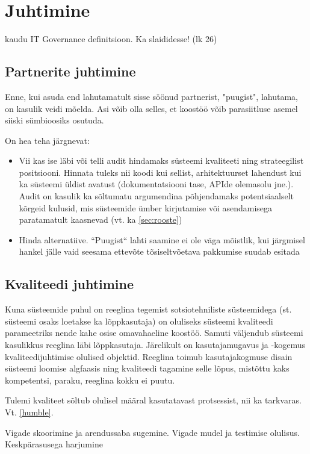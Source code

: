 \chapter{Juhtimine}
\TODO \cite{svcthesis} kaudu IT Governance definitsioon. Ka slaididesse! (lk 26)
\section{Partnerite juhtimine}
Enne, kui asuda end lahutamatult sisse söönud partnerist, "puugist", lahutama, on kasulik veidi mõelda. Asi võib olla selles, et koostöö võib parasiitluse asemel siiski sümbioosiks osutuda. 

On hea teha järgnevat:
\begin{itemize}
	\item Vii kas ise läbi või telli audit hindamaks süsteemi kvaliteeti ning strateegilist positsiooni. Hinnata tuleks nii koodi kui sellist, arhitektuurset lahendust kui ka süsteemi üldist avatust (dokumentatsiooni tase, APIde olemasolu jne.). Audit on kasulik ka sõltumatu argumendina põhjendamaks potentsiaalselt kõrgeid kulusid, mis süsteemide ümber kirjutamise või asendamisega paratamatult kaasnevad (vt. ka \ref{sec:rooste})
	\item Hinda alternatiive. ``Puugist`` lahti saamine ei ole väga mõistlik, kui järgmisel hankel jälle vaid seesama ettevõte tõsiseltvõetava pakkumise suudab esitada  
\end{itemize}

\section{Kvaliteedi juhtimine}
Kuna süsteemide puhul on reeglina tegemist sotsiotehniliste süsteemidega (st. süsteemi osaks loetakse ka lõppkasutaja) on oluliseks süsteemi kvaliteedi parameetriks nende kahe osise omavahaeline koostöö. Samuti väljendub süsteemi kasulikkus reeglina läbi lõppkasutaja. Järelikult on kasutajamugavus ja -kogemus kvaliteedijuhtimise olulised objektid. Reeglina toimub kasutajakogmuse disain süsteemi loomise algfaasis ning kvaliteedi tagamine selle lõpus, mistõttu kaks kompetentsi, paraku, reeglina kokku ei puutu.  

Tulemi kvaliteet sõltub olulisel määral kasutatavast protsessist, nii ka tarkvaras. Vt. \ref{humble}.

\TODO Vigade skoorimine ja arendussaba sugemine. Vigade mudel ja testimise olulisus. Keskpärasusega harjumine


